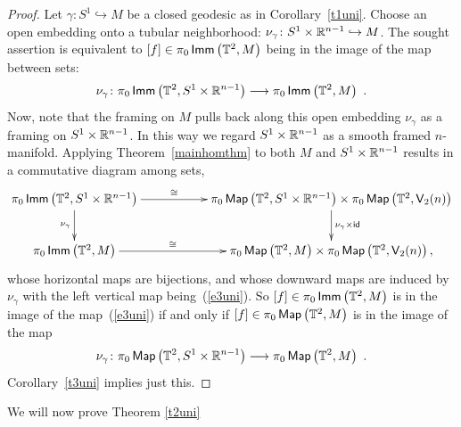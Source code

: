 \begin{proof}
Let $\gamma\colon S^1\hookrightarrow M$ be a closed geodesic as in Corollary~\ref{t1uni}.
Choose an open embedding onto a tubular neighborhood: $\nu_\gamma\colon S^1\times \mathbb R^{n-1} \hookrightarrow M$.
The sought assertion is equivalent to $[f] \in \pi_0
\operatorname{\sf Imm}
\left(
\mathbb T^2
,
M
\right)
$ 
being in the image of the map between sets:
\begin{equation}
\label{e3uni}
\nu_\gamma
\colon
\pi_0
\operatorname{\sf Imm}
\left(
\mathbb T^2
,
S^1\times \mathbb R^{n-1}
\right)
\longrightarrow
\pi_0
\operatorname{\sf Imm}
\left(
\mathbb T^2
,
M
\right)
~.
\end{equation}
Now, note that the framing on $M$ pulls back along this open embedding $\nu_\gamma$ as a framing on $S^1\times \mathbb R^{n-1}$.
In this way we regard $S^1 \times \mathbb R^{n-1}$ as a smooth framed $n$-manifold.
Applying Theorem~\ref{mainhomthm} to both $M$ and $S^1\times \mathbb R^{n-1}$ results in a commutative diagram among sets, 
\[
\xymatrix{
\pi_0
\Imm
\left(
\TT^2
,
S^1\times \RR^{n-1}
\right)
\ar[rr]^-{\cong}
\ar[d]_-{\nu_\gamma}
&&
\pi_0
\Map
\left(
\TT^2
,
S^1\times \RR^{n-1}
\right)
\times
\pi_0
\Map
\left(
\TT^2
,
\sV_2(n)
\right)
\ar[d]^-{\nu_\gamma \times \id}
\\
\pi_0
\Imm
\left(
\TT^2
,
M
\right)
\ar[rr]^-{\cong}
&&
\pi_0
\Map
\left(
\TT^2
,
M
\right)
\times
\pi_0
\Map
\left(
\TT^2
,
\sV_2(n)
\right)
,
}
\]
whose horizontal maps are bijections, 
and
whose downward maps are induced by $\nu_\gamma$ with the left vertical map being~(\ref{e3uni}).
So $[f]\in \pi_0 \operatorname{\sf Imm}
\left(
\mathbb T^2
,
M
\right)
$ is in the image of the map~(\ref{e3uni}) if and only if $[f]\in \pi_0
\operatorname{{\sf Map}} \left( 
\mathbb T^2
,
M
\right)
$ is in the image of the map
\[
\nu_\gamma
\colon
\pi_0
\operatorname{{\sf Map}}
\left(
\mathbb T^2
,
S^1\times \mathbb R^{n-1}
\right)
\longrightarrow
\pi_0
\operatorname{{\sf Map}}
\left(
\mathbb T^2
,
M
\right)
~.
\]
Corollary~\ref{t3uni} implies just this.
\end{proof}



\begin{remark}\label{proofss}
We will now prove Theorem \ref{t2uni}
\end{remark}


